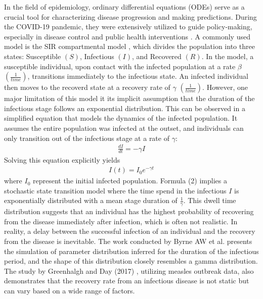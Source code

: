 \documentclass[12pt]{article}
\begin{document}
In the field of epidemiology, ordinary differential equations (ODEs) serve as a crucial tool for characterizing disease progression and making predictions. During the COVID-19 pandemic, they were extensively utilized to guide policy-making, especially in disease control and public health interventions \cite{thompson2020epidemiological}. A commonly used model is the SIR compartmental model \cite{Anderson1991}\cite{kermack1927contribution}, which divides the population into three states: Susceptible $(S)$, Infectious $(I)$, and Recovered $(R)$. In the model, a susceptible individual, upon contact with the infected population at a rate $\beta$ $(\frac{1}{time})$, transitions immediately to the infectious state. An infected individual then moves to the recoverd state at a recovery rate of $\gamma$ $(\frac{1}{time})$. However, one major limitation of this model it its implicit assumption that the duration of the infectious stage follows an exponential distribution. This can be observed in a simplified equation that models the dynamics of the infected population. It assumes the entire population was infected at the outset, and individuals can only transition out of the infectious stage at a rate of $\gamma$:
\begin{align}
    \frac{dI}{dt} = -\gamma I
\end{align}
Solving this equation explicitly yields
\begin{align}
    I(t) = I_0 e^{-\gamma t}
\end{align}
where $I_0$ represent the initial infected population. Formula (2) implies a stochastic state transition model where the time spend in the infectious $I$ is exponentially distributed with a mean stage duration of $\frac{1}{\gamma}$. This dwell time distribution suggests that an individual has the highest probability of recovering from the disease immediately after infection, which is often not realistic. In reality, a delay between the successful infection of an individual and the recovery from the disease is inevitable. The work conducted by Byrne AW et al. \cite{byrne2020inferred} presents the simulation of parameter distribution inferred for the duration of the infectious period, and the shape of this distribution closely resembles a gamma distribution. The study by Greenhalgh and Day (2017) \cite{greenhalgh2017time}, utilizing measles outbreak data, also demonstrates that the recovery rate from an infectious disease is not static but can vary based on a wide range of factors.
\end{document}
